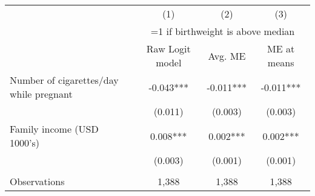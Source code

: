 \begin{tabular}{l *{3}{c}}
\toprule
                    &         (1)   &         (2)   &         (3)   \\
 & \multicolumn{3}{c}{=1 if birthweight is above median} \\
\cmidrule(lr){2-4}
 & Raw Logit model & Avg. ME & ME at means \\
\midrule
Number of cigarettes/day while pregnant&      -0.043***&      -0.011***&      -0.011***\\
                    &     (0.011)   &     (0.003)   &     (0.003)   \\
Family income (USD 1000's)&       0.008***&       0.002***&       0.002***\\
                    &     (0.003)   &     (0.001)   &     (0.001)   \\
\\
Observations        &       1,388   &       1,388   &       1,388   \\
\bottomrule
\end{tabular}
